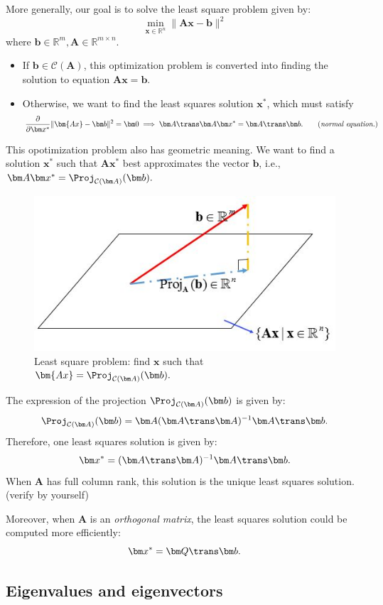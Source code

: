 \begin{enumerate}
More generally, our goal is to solve the least square problem given by:
\[
\min_{\bm x\in\mathbb{R}^{n}}\|\bm{Ax}-\bm b\|^2
\]
where $\bm b\in\mathbb{R}^{m},\bm A\in\mathbb{R}^{m\times n}$.
\begin{itemize}
\item
If $\bm b\in\mathcal{C}(\bm A)$, this optimization problem is converted into finding the solution to equation $\bm{Ax}=\bm b$.
\item
Otherwise, we want to find the least squares solution $\bm x^*$, which must satisfy
\[
\frac{\partial }{\partial \bm x^*}\|\bm{Ax}-\bm b\|^2=\bm 0\implies\bm A\trans\bm A\bm x^*=\bm A\trans\bm b.\qquad\text{(\emph{normal equation.})}
\]
\end{itemize}
This opotimization problem also has geometric meaning. We want to find a solution $\bm x^*$ such that $\bm A\bm x^*$ best approximates the vector $\bm b$, i.e., $\bm A\bm x^* = \Proj_{\mathcal{C}(\bm A)}(\bm b).$
\begin{figure}[H]
\centering\includegraphics{week6/least_square}
\caption{Least square problem: find $\bm x$ such that $\bm{Ax}=\Proj_{\mathcal{C}(\bm A)}(\bm b).$}
\end{figure}
The expression of the projection $\Proj_{\mathcal{C}(\bm A)}(\bm b)$ is given by:
\[
\Proj_{\mathcal{C}(\bm A)}(\bm b) = \bm A(\bm A\trans\bm A)^{-1}\bm A\trans\bm b.
\]
Therefore, one least squares solution is given by:
\[
\bm x^*=(\bm A\trans\bm A)^{-1}\bm A\trans\bm b.
\]
When $\bm A$ has full column rank, this solution is the unique least squares solution. (verify by yourself)

Moreover, when $\bm A$ is an \emph{orthogonal matrix}, the least squares solution could be computed more efficiently:
\[
\bm x^*=\bm Q\trans\bm b.
\]
\end{enumerate}

\subsection{Eigenvalues and eigenvectors}
